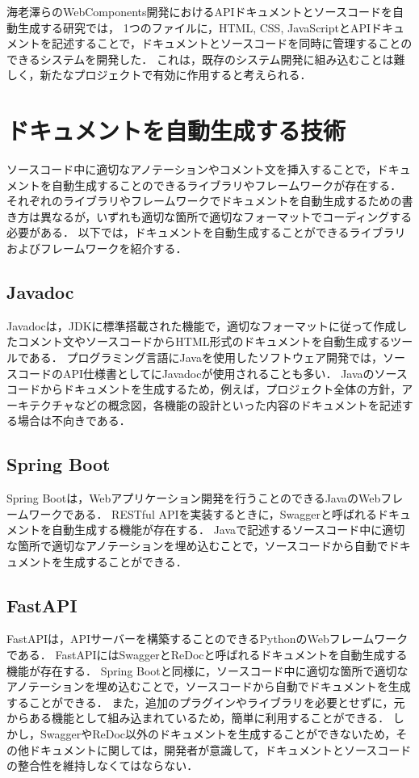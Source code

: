 海老澤らのWebComponents開発におけるAPIドキュメントとソースコードを自動生成する研究\cite{webcomponents}では，
1つのファイルに，HTML, CSS, JavaScriptとAPIドキュメントを記述することで，ドキュメントとソースコードを同時に管理することのできるシステムを開発した．
これは，既存のシステム開発に組み込むことは難しく，新たなプロジェクトで有効に作用すると考えられる．

\section{ドキュメントを自動生成する技術}
ソースコード中に適切なアノテーションやコメント文を挿入することで，ドキュメントを自動生成することのできるライブラリやフレームワークが存在する．
それぞれのライブラリやフレームワークでドキュメントを自動生成するための書き方は異なるが，いずれも適切な箇所で適切なフォーマットでコーディングする必要がある．
以下では，ドキュメントを自動生成することができるライブラリおよびフレームワークを紹介する．

\subsection{Javadoc}
Javadocは，JDKに標準搭載された機能で，適切なフォーマットに従って作成したコメント文やソースコードからHTML形式のドキュメントを自動生成するツールである．
プログラミング言語にJavaを使用したソフトウェア開発では，ソースコードのAPI仕様書としてにJavadocが使用されることも多い．
Javaのソースコードからドキュメントを生成するため，例えば，プロジェクト全体の方針，アーキテクチャなどの概念図，各機能の設計といった内容のドキュメントを記述する場合は不向きである．

\subsection{Spring Boot}
Spring Bootは，Webアプリケーション開発を行うことのできるJavaのWebフレームワークである．
RESTful APIを実装するときに，Swaggerと呼ばれるドキュメントを自動生成する機能が存在する．
Javaで記述するソースコード中に適切な箇所で適切なアノテーションを埋め込むことで，ソースコードから自動でドキュメントを生成することができる．

\subsection{FastAPI}
FastAPIは，APIサーバーを構築することのできるPythonのWebフレームワークである．
FastAPIにはSwaggerとReDocと呼ばれるドキュメントを自動生成する機能が存在する．
Spring Bootと同様に，ソースコード中に適切な箇所で適切なアノテーションを埋め込むことで，ソースコードから自動でドキュメントを生成することができる．
また，追加のプラグインやライブラリを必要とせずに，元からある機能として組み込まれているため，簡単に利用することができる．
しかし，SwaggerやReDoc以外のドキュメントを生成することができないため，その他ドキュメントに関しては，開発者が意識して，ドキュメントとソースコードの整合性を維持しなくてはならない．

